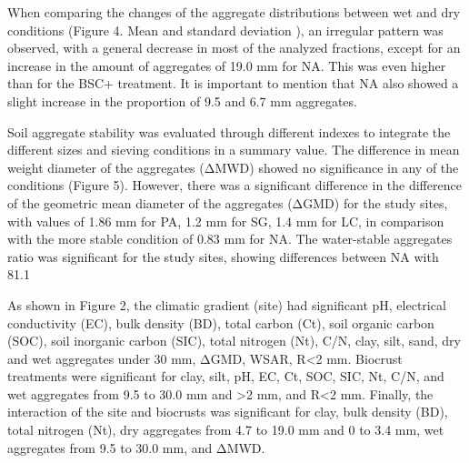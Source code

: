 
When comparing the changes of the aggregate distributions between wet and dry conditions (Figure 4. Mean and standard deviation ), an irregular pattern was observed, with a general decrease in most of the analyzed fractions, except for an increase in the amount of aggregates of 19.0 mm for NA. This was even higher than for the BSC+ treatment. It is important to mention that NA also showed a slight increase in the proportion of 9.5 and 6.7 mm aggregates.


Soil aggregate stability was evaluated through different indexes to integrate the different sizes and sieving conditions in a summary value. The difference in mean weight diameter of the aggregates (ΔMWD) showed no significance in any of the conditions (Figure 5). However, there was a significant difference in the difference of the geometric mean diameter of the aggregates (ΔGMD) for the study sites, with values of 1.86 mm for PA, 1.2 mm for SG, 1.4 mm for LC, in comparison with the more stable condition of 0.83 mm for NA. The water-stable aggregates ratio was significant for the study sites, showing differences between NA with 81.1%


As shown in Figure 2, the climatic gradient (site) had significant pH, electrical conductivity (EC), bulk density (BD), total carbon (Ct), soil organic carbon (SOC), soil inorganic carbon (SIC), total nitrogen (Nt), C/N, clay, silt, sand, dry and wet aggregates under 30 mm, ΔGMD, WSAR, R<2 mm. Biocrust treatments were significant for clay, silt, pH, EC, Ct, SOC, SIC, Nt, C/N, and wet aggregates from 9.5 to 30.0 mm and >2 mm, and R<2 mm. Finally, the interaction of the site and biocrusts was significant for clay, bulk density (BD), total nitrogen (Nt), dry aggregates from 4.7 to 19.0 mm and 0 to 3.4 mm, wet aggregates from 9.5 to 30.0 mm, and ΔMWD.

